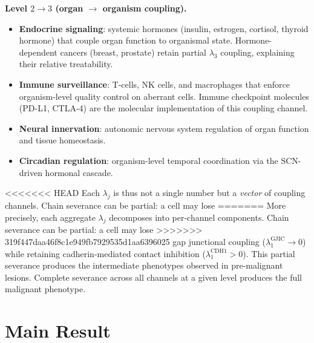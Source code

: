 \documentclass[11pt]{article}
\theoremstyle{definition}
\theoremstyle{remark}
\begin{document}
\textbf{Level $2 \to 3$ (organ $\to$ organism coupling).}
\begin{itemize}
\item \textbf{Endocrine signaling}: systemic hormones (insulin,
   estrogen, cortisol, thyroid hormone) that couple organ function
   to organismal state. Hormone-dependent cancers (breast, prostate)
   retain partial $\lambda_3$ coupling, explaining their relative
   treatability.
\item \textbf{Immune surveillance}: T-cells, NK cells, and
   macrophages that enforce organism-level quality control on
   aberrant cells. Immune checkpoint molecules (PD-L1, CTLA-4) are
   the molecular implementation of this coupling channel.
\item \textbf{Neural innervation}: autonomic nervous system
   regulation of organ function and tissue homeostasis.
\item \textbf{Circadian regulation}: organism-level temporal
   coordination via the SCN-driven hormonal cascade.
\end{itemize}

<<<<<<< HEAD
Each $\lambda_j$ is thus not a single number but a \emph{vector} of
coupling channels. Chain severance can be partial: a cell may lose
=======
More precisely, each aggregate $\lambda_j$ decomposes into per-channel
components. Chain severance can be partial: a cell may lose
>>>>>>> 319f447daa46f8c1e949fb7929535d1aa6396025
gap junctional coupling ($\lambda_1^{\mathrm{GJIC}} \to 0$) while
retaining cadherin-mediated contact inhibition
($\lambda_1^{\mathrm{CDH1}} > 0$). This partial severance produces
the intermediate phenotypes observed in pre-malignant lesions.
Complete severance across all channels at a given level produces the
full malignant phenotype.

\section{Main Result}
\label{sec:main}
\end{document}

